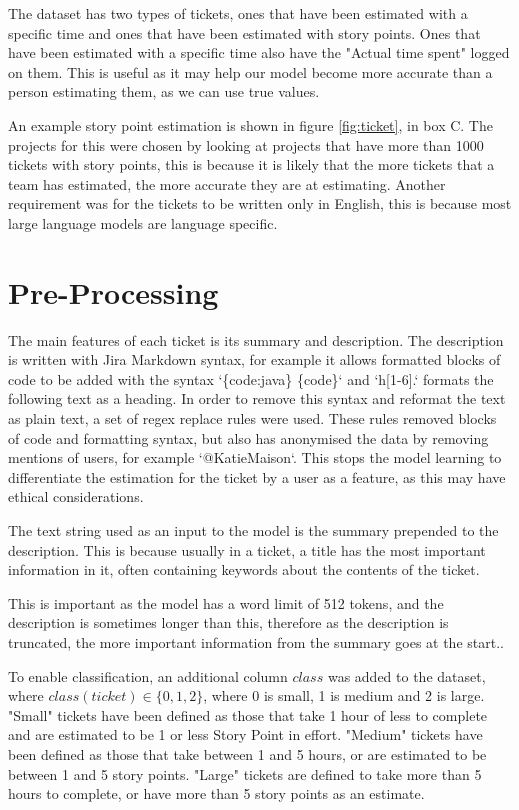 \documentclass{UoYCSproject}
\begin{document}
    The dataset has two types of tickets, ones that have been estimated with a specific time and ones that have been estimated with story points.
    Ones that have been estimated with a specific time also have the "Actual time spent" logged on them.
    This is useful as it may help our model become more accurate than a person estimating them, as we can use true values. \par
    An example story point estimation is shown in figure \ref{fig:ticket}, in box C.
    The projects for this were chosen by looking at projects that have more than 1000 tickets with story points, this is because it is likely that the more tickets that a team has estimated, the more accurate they are at estimating.
    Another requirement was for the tickets to be written only in English, this is because most large language models are language specific.


    \section{Pre-Processing}\label{sec:preprocessing}

    The main features of each ticket is its summary and description.
    The description is written with Jira Markdown syntax, for example it allows formatted blocks of code to be added with the syntax `\{code:java\} \{code\}` and `h[1-6].` formats the following text as a heading.
    In order to remove this syntax and reformat the text as plain text, a set of regex replace rules were used.
    These rules removed blocks of code and formatting syntax, but also has anonymised the data by removing mentions of users, for example `@KatieMaison`.
    This stops the model learning to differentiate the estimation for the ticket by a user as a feature, as this may have ethical considerations. \par

    The text string used as an input to the model is the summary prepended to the description.
    This is because usually in a ticket, a title has the most important information in it, often containing keywords about the contents of the ticket. \par
    This is important as the model has a word limit of 512 tokens, and the description is sometimes longer than this, therefore as the description is truncated, the more important information from the summary goes at the start..

    To enable classification, an additional column $class$ was added to the dataset, where $class(ticket) \in \{0,1,2\}$, where 0 is small, 1 is medium and 2 is large.
    "Small" tickets have been defined as those that take 1 hour of less to complete and are estimated to be 1 or less Story Point in effort.
    "Medium" tickets have been defined as those that take between 1 and 5 hours, or are estimated to be between 1 and 5 story points.
    "Large" tickets are defined to take more than 5 hours to complete, or have more than 5 story points as an estimate.
\end{document}
